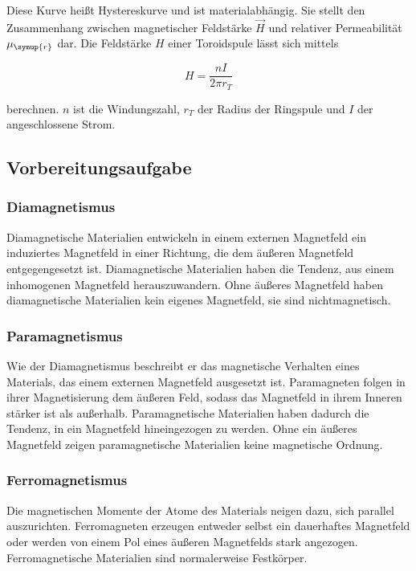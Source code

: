 \documentclass[
  bibliography=totoc,     %
  captions=tableheading,  %
  titlepage=firstiscover, %
]{scrartcl}
\begin{document}
  Diese Kurve heißt Hystereskurve und ist materialabhängig. Sie stellt den Zusammenhang zwischen magnetischer Feldstärke
  $\vec{H}$ und relativer Permeabilität $\mu_{\symup{r}}$ dar.
  Die Feldstärke $H$ einer Toroidspule lässt sich mittels 
  
  \begin{equation}
    \label{eqn:H}
    H = \frac{nI}{2 \pi r_T}
  \end{equation}
  
  berechnen. $n$ ist die Windungszahl, $r_T$ der Radius der Ringspule und $I$ der angeschlossene Strom.
  
  \subsection{Vorbereitungsaufgabe}
  \subsubsection{Diamagnetismus}
  Diamagnetische Materialien entwickeln in einem externen Magnetfeld ein induziertes Magnetfeld in einer Richtung, die dem 
  äußeren Magnetfeld entgegengesetzt ist. Diamagnetische Materialien haben die Tendenz, aus einem inhomogenen Magnetfeld herauszuwandern.
  Ohne äußeres Magnetfeld haben diamagnetische Materialien kein eigenes Magnetfeld, sie sind nichtmagnetisch.

  \subsubsection{Paramagnetismus}
  Wie der Diamagnetismus beschreibt er das magnetische Verhalten eines Materials, das einem externen Magnetfeld ausgesetzt ist.
  Paramagneten folgen in ihrer Magnetisierung dem äußeren Feld, sodass das Magnetfeld in ihrem Inneren stärker ist als außerhalb.
  Paramagnetische Materialien haben dadurch die Tendenz, in ein Magnetfeld hineingezogen zu werden. Ohne ein äußeres Magnetfeld
  zeigen paramagnetische Materialien keine magnetische Ordnung.

  \subsubsection{Ferromagnetismus}
  Die magnetischen Momente der Atome des Materials neigen dazu, sich parallel auszurichten. Ferromagneten erzeugen entweder selbst
  ein dauerhaftes Magnetfeld oder werden von einem Pol eines äußeren Magnetfelds stark angezogen. Ferromagnetische Materialien sind 
  normalerweise Festkörper.
\end{document}
